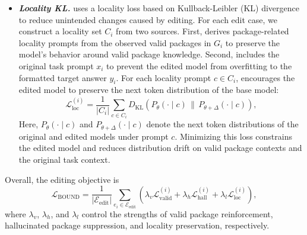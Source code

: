 \begin{itemize}[leftmargin=0.5cm]
\item \textbf{\textit{Locality KL.}} \appname uses a locality loss based on Kullback-Leibler (KL) divergence to reduce unintended changes caused by editing. For each edit case, we construct a locality set $C_i$ from two sources. First, \appname derives package-related locality prompts from the observed valid packages in $G_i$ to preserve the model’s behavior around valid package knowledge. Second, \appname includes the original task prompt $x_i$ to prevent the edited model from overfitting to the formatted target answer $y_i$. For each locality prompt $c \in C_i$, \appname encourages the edited model to preserve the next token distribution of the base model:
\begin{equation}
    \mathcal{L}_{\mathrm{loc}}^{(i)}
    =
    \frac{1}{|C_i|}
    \sum_{c \in C_i}
    D_{\mathrm{KL}}
    \left(
    P_{\theta}(\cdot \mid c)
    \,\|\, 
    P_{\theta+\Delta}(\cdot \mid c)
    \right),
\end{equation}
Here, $P_{\theta}(\cdot \mid c)$ and $P_{\theta+\Delta}(\cdot \mid c)$ denote the next token distributions of the original and edited models under prompt $c$. 
Minimizing this loss constrains the edited model and reduces distribution drift on valid package contexts and the original task context.
\end{itemize}

Overall, the editing objective is
\begin{equation}
    \mathcal{L}_{\mathrm{BOUND}}
    =
    \frac{1}{|\mathcal{E}_{\mathrm{edit}}|}
    \sum_{e_i \in \mathcal{E}_{\mathrm{edit}}}
    \left(
    \lambda_v \mathcal{L}_{\mathrm{valid}}^{(i)}
    +
    \lambda_h \mathcal{L}_{\mathrm{hall}}^{(i)}
    +
    \lambda_l \mathcal{L}_{\mathrm{loc}}^{(i)}
    \right),
\end{equation}
where $\lambda_v$, $\lambda_h$, and $\lambda_l$ control the strengths of valid package reinforcement, hallucinated package suppression, and locality preservation, respectively.

